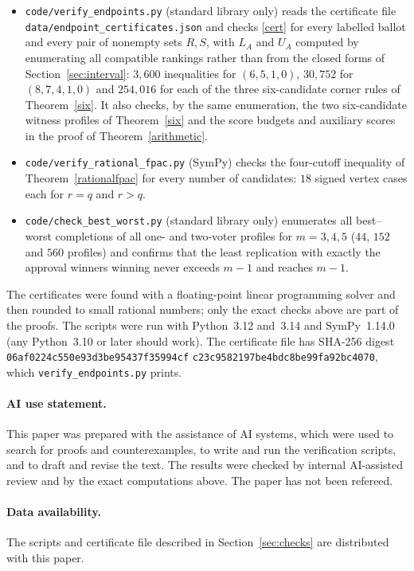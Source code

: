 \documentclass[11pt,a4paper]{article}
\theoremstyle{definition}
\theoremstyle{remark}
\begin{document}
{\sloppy\begin{itemize}[nosep,leftmargin=*]
\item \texttt{code/verify\_endpoints.py} (standard library only) reads the certificate file \texttt{data/endpoint\_certificates.json} and checks \eqref{cert} for every labelled ballot and every pair of nonempty sets $R,S$, with $L_A$ and $U_A$ computed by enumerating all compatible rankings rather than from the closed forms of Section~\ref{sec:interval}: $3{,}600$ inequalities for $(6,5,1,0)$, $30{,}752$ for $(8,7,4,1,0)$ and $254{,}016$ for each of the three six-candidate corner rules of Theorem~\ref{six}. It also checks, by the same enumeration, the two six-candidate witness profiles of Theorem~\ref{six} and the score budgets and auxiliary scores in the proof of Theorem~\ref{arithmetic}.
\item \texttt{code/verify\_rational\_fpac.py} (SymPy) checks the four-cutoff inequality of Theorem~\ref{rationalfpac} for every number of candidates: $18$ signed vertex cases each for $r=q$ and $r>q$.
\item \texttt{code/check\_best\_worst.py} (standard library only) enumerates all best--worst completions of all one- and two-voter profiles for $m=3,4,5$ ($44$, $152$ and $560$ profiles) and confirms that the least replication with exactly the approval winners winning never exceeds $m-1$ and reaches $m-1$.
\end{itemize}\par}
The certificates were found with a floating-point linear programming solver and then rounded to small rational numbers; only the exact checks above are part of the proofs. The scripts were run with Python~3.12 and~3.14 and SymPy~1.14.0 (any Python~3.10 or later should work). The certificate file has SHA-256 digest \texttt{06af0224c550e93d3be95437f35994cf} \texttt{c23c9582197be4bdc8be99fa92bc4070}, which \texttt{verify\_endpoints.py} prints.

\paragraph{AI use statement.} This paper was prepared with the assistance of AI systems, which were used to search for proofs and counterexamples, to write and run the verification scripts, and to draft and revise the text. The results were checked by internal AI-assisted review and by the exact computations above. The paper has not been refereed.

\paragraph{Data availability.} The scripts and certificate file described in Section~\ref{sec:checks} are distributed with this paper.
\end{document}
